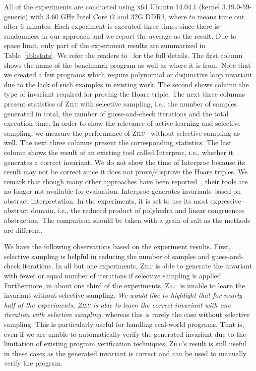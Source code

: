 All of the experiments are conducted using x64 Ubuntu 14.04.1 (kernel 3.19.0-59-generic) with 3.60 GHz Intel Core i7 and 32G DDR3, where $to$ means time out after 6 minutes. Each experiment is executed three times since there is randomness in our approach and we report the average as the result. Due to space limit, only part of the experiment results are summarized in Table~\ref{tbl:stats}. We refer the readers to~\cite{zilu:repo} for the full details. The first column shows the name of the benchmark program as well as where it is from. Note that we created a few programs which require polynomial or disjunctive loop invariant due to the lack of such examples in existing work. The second shows column the type of invariant required for proving the Hoare triple. The next three columns present statistics of \textsc{Zilu} with selective sampling, i.e., the number of samples generated in total, the number of guess-and-check iterations and the total execution time. In order to show the relevance of active learning and selective sampling, we measure the performance of \textsc{Zilu}~\cite{zilu:repo} without selective sampling as well. The next three columns present the corresponding statistics. The last column shows the result of an existing tool called Interproc, i.e., whether it generates a correct invariant. We do not show the time of Interproc because its result may not be correct since it does not prove/disprove the Hoare triples. We remark that though many other approaches have been reported~\cite{sharma2012interpolants,sharma2013verification,DBLP:conf/esop/0001GHALN13,sharma2014invariant}, their tools are no longer not available for evaluation. Interproc generates invariants based on abstract interpretation. In the experiments, it is set to use its most expressive abstract domain, i.e., the reduced product of polyhedra and linear congruences abstraction. The comparison should be taken with a grain of salt as the methods are different.

We have the following observations based on the experiment results. First, selective sampling is helpful in reducing the number of samples and guess-and-check iterations. In all but one experiments, \textsc{Zilu} is able to generate the invariant with fewer or equal number of iterations if selective sampling is applied. Furthermore, in about one third of the experiments, \textsc{Zilu} is unable to learn the invariant without selective sampling. 
\emph{We would like to highlight that for nearly half of the experiments, \textsc{Zilu} is able to learn the correct invariant with one iteration with selective sampling}, whereas this is rarely the case without selective sampling. This is particularly useful for handling real-world programs. That is, even if we are unable to automatically verify the generated invariant due to the limitation of existing program verification techniques, \textsc{Zilu}'s result is still useful in these cases as the generated invariant is correct and can be used to manually verify the program.



